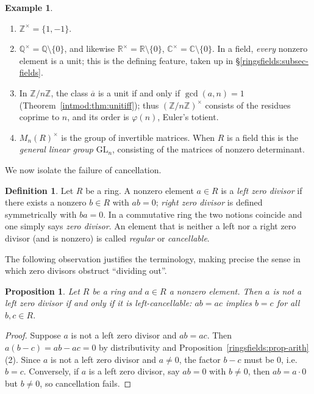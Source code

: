 \documentclass[11pt,a4paper]{article}
\newtheorem{proposition}[theorem]{Proposition}
\theoremstyle{definition}
\newtheorem{definition}[theorem]{Definition}
\newtheorem{example}[theorem]{Example}
\theoremstyle{remark}
\newcommand{\Z}{\ensuremath{\mathbb{Z}}}
\newcommand{\Q}{\ensuremath{\mathbb{Q}}}
\newcommand{\R}{\ensuremath{\mathbb{R}}}
\providecommand{\C}{}\renewcommand{\C}{\ensuremath{\mathbb{C}}}
\begin{document}
\begin{example}\label{ringsfields:exa-units}
\begin{enumerate}
\item \(\Z^{\times} = \{1,-1\}\).
\item \(\Q^{\times}=\Q\setminus\{0\}\), and likewise \(\R^{\times}=\R\setminus\{0\}\), \(\C^{\times}=\C\setminus\{0\}\). In a field, \emph{every} nonzero element is a unit; this is the defining feature, taken up in \S\ref{ringsfields:subsec-fields}.
\item In \(\Z/n\Z\), the class \(\overline a\) is a unit if and only if \(\gcd(a,n)=1\) (Theorem~\ref{intmod:thm:unitiff}); thus \((\Z/n\Z)^{\times}\) consists of the residues coprime to \(n\), and its order is \(\varphi(n)\), Euler's totient.
\item \(M_n(R)^{\times}\) is the group of invertible matrices. When \(R\) is a field this is the \emph{general linear group} \(\mathrm{GL}_n\), consisting of the matrices of nonzero determinant.
\end{enumerate}
\end{example}

We now isolate the failure of cancellation.

\begin{definition}\label{ringsfields:def-zerodiv}
Let \(R\) be a ring. A nonzero element \(a\in R\) is a \emph{left zero divisor} if there exists a nonzero \(b\in R\) with \(ab = 0\); \emph{right zero divisor} is defined symmetrically with \(ba=0\). In a commutative ring the two notions coincide and one simply says \emph{zero divisor}. An element that is neither a left nor a right zero divisor (and is nonzero) is called \emph{regular} or \emph{cancellable}.
\end{definition}

The following observation justifies the terminology, making precise the sense in which zero divisors obstruct ``dividing out''.

\begin{proposition}\label{ringsfields:prop-cancel}
Let \(R\) be a ring and \(a\in R\) a nonzero element. Then \(a\) is not a left zero divisor if and only if it is \emph{left-cancellable}: \(ab = ac\) implies \(b=c\) for all \(b,c\in R\).
\end{proposition}

\begin{proof}
Suppose \(a\) is not a left zero divisor and \(ab=ac\). Then \(a(b-c)=ab-ac=0\) by distributivity and Proposition~\ref{ringsfields:prop-arith}(2). Since \(a\) is not a left zero divisor and \(a\neq 0\), the factor \(b-c\) must be \(0\), i.e.\ \(b=c\). Conversely, if \(a\) is a left zero divisor, say \(ab=0\) with \(b\neq 0\), then \(ab = a\cdot 0\) but \(b\neq 0\), so cancellation fails.
\end{proof}
\end{document}
